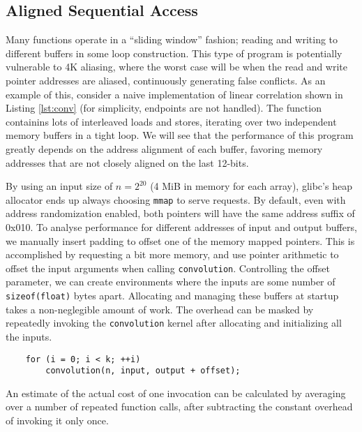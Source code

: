 \documentclass[a4paper,10pt,twocolumn,twoside]{article}
\begin{document}
{\subsection{Aligned Sequential Access}
Many functions operate in a ``sliding window'' fashion; reading and writing to different buffers in some loop construction.
This type of program is potentially vulnerable to 4K aliasing, where the worst case will be when the read and write pointer addresses are aliased, continuously generating false conflicts.
As an example of this, consider a naive implementation of linear correlation shown in Listing \ref{lst:conv} (for simplicity, endpoints are not handled).
The function containins lots of interleaved loads and stores, iterating over two independent memory buffers in a tight loop.
We will see that the performance of this program greatly depends on the address alignment of each buffer, favoring memory addresses that are not closely aligned on the last 12-bits.



By using an input size of $n=2^{20}$ (4 MiB in memory for each array), glibc's heap allocator ends up always choosing \texttt{mmap} to serve requests.
By default, even with address randomization enabled, both pointers will have the same address suffix of 0x010.
To analyse performance for different addresses of input and output buffers, we manually insert padding to offset one of the memory mapped pointers.
This is accomplished by requesting a bit more memory, and use pointer arithmetic to offset the input arguments when calling \texttt{convolution}.
Controlling the offset parameter, we can create environments where the inputs are some number of \texttt{sizeof(float)} bytes apart.
Allocating and managing these buffers at startup takes a non-neglegible amount of work.
The overhead can be masked by repeatedly invoking the \texttt{convolution} kernel after allocating and initializing all the inputs.
\begin{lstlisting}
    for (i = 0; i < k; ++i)
        convolution(n, input, output + offset);
\end{lstlisting}
An estimate of the actual cost of one invocation can be calculated by averaging over a number of repeated function calls, after subtracting the constant overhead of invoking it only once.

}
\end{document}
